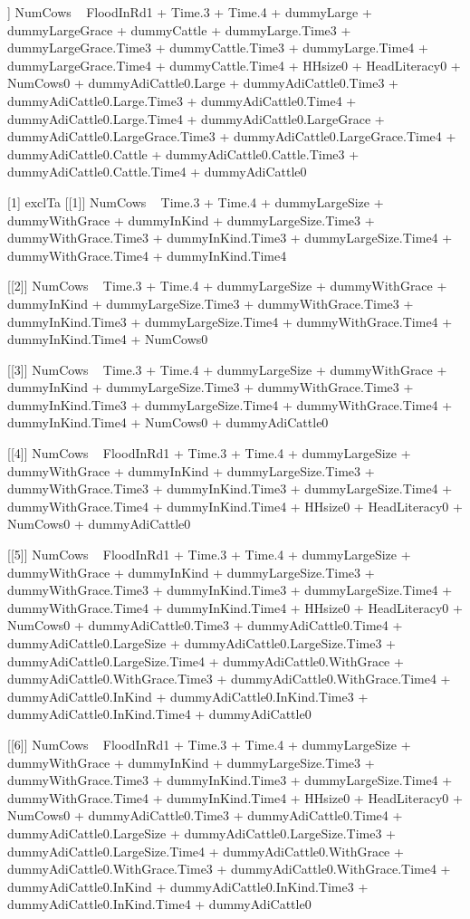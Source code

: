 \begin{Schunk}
\begin{Soutput}
[[6]]
NumCows ~ FloodInRd1 + Time.3 + Time.4 + dummyLarge + dummyLargeGrace + 
    dummyCattle + dummyLarge.Time3 + dummyLargeGrace.Time3 + 
    dummyCattle.Time3 + dummyLarge.Time4 + dummyLargeGrace.Time4 + 
    dummyCattle.Time4 + HHsize0 + HeadLiteracy0 + NumCows0 + 
    dummyAdiCattle0.Large + dummyAdiCattle0.Time3 + dummyAdiCattle0.Large.Time3 + 
    dummyAdiCattle0.Time4 + dummyAdiCattle0.Large.Time4 + dummyAdiCattle0.LargeGrace + 
    dummyAdiCattle0.LargeGrace.Time3 + dummyAdiCattle0.LargeGrace.Time4 + 
    dummyAdiCattle0.Cattle + dummyAdiCattle0.Cattle.Time3 + dummyAdiCattle0.Cattle.Time4 + 
    dummyAdiCattle0

[1] exclTa
[[1]]
NumCows ~ Time.3 + Time.4 + dummyLargeSize + dummyWithGrace + 
    dummyInKind + dummyLargeSize.Time3 + dummyWithGrace.Time3 + 
    dummyInKind.Time3 + dummyLargeSize.Time4 + dummyWithGrace.Time4 + 
    dummyInKind.Time4

[[2]]
NumCows ~ Time.3 + Time.4 + dummyLargeSize + dummyWithGrace + 
    dummyInKind + dummyLargeSize.Time3 + dummyWithGrace.Time3 + 
    dummyInKind.Time3 + dummyLargeSize.Time4 + dummyWithGrace.Time4 + 
    dummyInKind.Time4 + NumCows0

[[3]]
NumCows ~ Time.3 + Time.4 + dummyLargeSize + dummyWithGrace + 
    dummyInKind + dummyLargeSize.Time3 + dummyWithGrace.Time3 + 
    dummyInKind.Time3 + dummyLargeSize.Time4 + dummyWithGrace.Time4 + 
    dummyInKind.Time4 + NumCows0 + dummyAdiCattle0

[[4]]
NumCows ~ FloodInRd1 + Time.3 + Time.4 + dummyLargeSize + dummyWithGrace + 
    dummyInKind + dummyLargeSize.Time3 + dummyWithGrace.Time3 + 
    dummyInKind.Time3 + dummyLargeSize.Time4 + dummyWithGrace.Time4 + 
    dummyInKind.Time4 + HHsize0 + HeadLiteracy0 + NumCows0 + 
    dummyAdiCattle0

[[5]]
NumCows ~ FloodInRd1 + Time.3 + Time.4 + dummyLargeSize + dummyWithGrace + 
    dummyInKind + dummyLargeSize.Time3 + dummyWithGrace.Time3 + 
    dummyInKind.Time3 + dummyLargeSize.Time4 + dummyWithGrace.Time4 + 
    dummyInKind.Time4 + HHsize0 + HeadLiteracy0 + NumCows0 + 
    dummyAdiCattle0.Time3 + dummyAdiCattle0.Time4 + dummyAdiCattle0.LargeSize + 
    dummyAdiCattle0.LargeSize.Time3 + dummyAdiCattle0.LargeSize.Time4 + 
    dummyAdiCattle0.WithGrace + dummyAdiCattle0.WithGrace.Time3 + 
    dummyAdiCattle0.WithGrace.Time4 + dummyAdiCattle0.InKind + 
    dummyAdiCattle0.InKind.Time3 + dummyAdiCattle0.InKind.Time4 + 
    dummyAdiCattle0

[[6]]
NumCows ~ FloodInRd1 + Time.3 + Time.4 + dummyLargeSize + dummyWithGrace + 
    dummyInKind + dummyLargeSize.Time3 + dummyWithGrace.Time3 + 
    dummyInKind.Time3 + dummyLargeSize.Time4 + dummyWithGrace.Time4 + 
    dummyInKind.Time4 + HHsize0 + HeadLiteracy0 + NumCows0 + 
    dummyAdiCattle0.Time3 + dummyAdiCattle0.Time4 + dummyAdiCattle0.LargeSize + 
    dummyAdiCattle0.LargeSize.Time3 + dummyAdiCattle0.LargeSize.Time4 + 
    dummyAdiCattle0.WithGrace + dummyAdiCattle0.WithGrace.Time3 + 
    dummyAdiCattle0.WithGrace.Time4 + dummyAdiCattle0.InKind + 
    dummyAdiCattle0.InKind.Time3 + dummyAdiCattle0.InKind.Time4 + 
    dummyAdiCattle0


\end{Soutput}
\end{Schunk}
